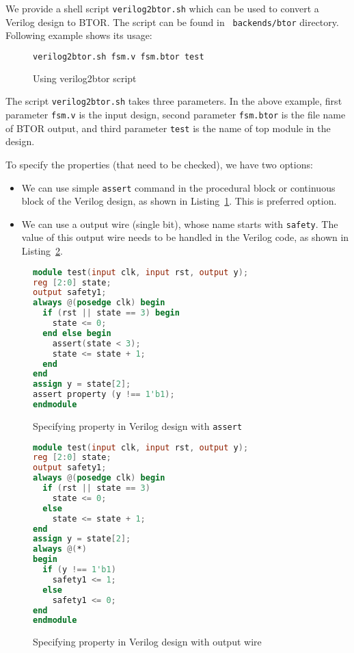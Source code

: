 \documentclass[9pt,technote,a4paper]{IEEEtran}
\begin{document}
We provide a shell script {\tt verilog2btor.sh} which can be used to
convert a Verilog design to BTOR.  The script can be found in {\tt
  backends/btor} directory.  Following example shows its usage:

\begin{figure}[H]
\begin{lstlisting}[language=sh]
verilog2btor.sh fsm.v fsm.btor test
\end{lstlisting}
 \renewcommand{\figurename}{Listing}
\caption{Using verilog2btor script}
\end{figure}

The script {\tt verilog2btor.sh} takes three parameters.  In the above
example, first parameter {\tt fsm.v} is the input design, second
parameter {\tt fsm.btor} is the file name of BTOR output, and third
parameter {\tt test} is the name of top module in the design.

To specify the properties (that need to be checked), we have two
options:
\begin{itemize}
\item We can use simple {\tt assert} command in the procedural block
  or continuous block of the Verilog design, as shown in
  Listing~\ref{specifying_property_assert}. This is preferred option.
\item We can use a output wire (single bit), whose name starts with
  {\tt safety}.  The value of this output wire needs to be handled in
  the Verilog code, as shown in
  Listing~\ref{specifying_property_output}.
\end{itemize}

\begin{figure}[H]
\begin{lstlisting}[language=Verilog]
module test(input clk, input rst, output y);
reg [2:0] state;
output safety1;
always @(posedge clk) begin
  if (rst || state == 3) begin
    state <= 0;
  end else begin
    assert(state < 3);
    state <= state + 1;
  end
end
assign y = state[2];
assert property (y !== 1'b1);
endmodule
\end{lstlisting}
\renewcommand{\figurename}{Listing}
\caption{Specifying property in Verilog design with {\tt assert}}
\label{specifying_property_assert}
\end{figure}

\begin{figure}[H]
\begin{lstlisting}[language=Verilog]
module test(input clk, input rst, output y);
reg [2:0] state;
output safety1;
always @(posedge clk) begin
  if (rst || state == 3)
    state <= 0;
  else
    state <= state + 1;
end
assign y = state[2];
always @(*)
begin
  if (y !== 1'b1)
    safety1 <= 1;
  else
    safety1 <= 0;
end
endmodule
\end{lstlisting}
\renewcommand{\figurename}{Listing}
\caption{Specifying property in Verilog design with output wire}
\label{specifying_property_output}
\end{figure}
\end{document}
